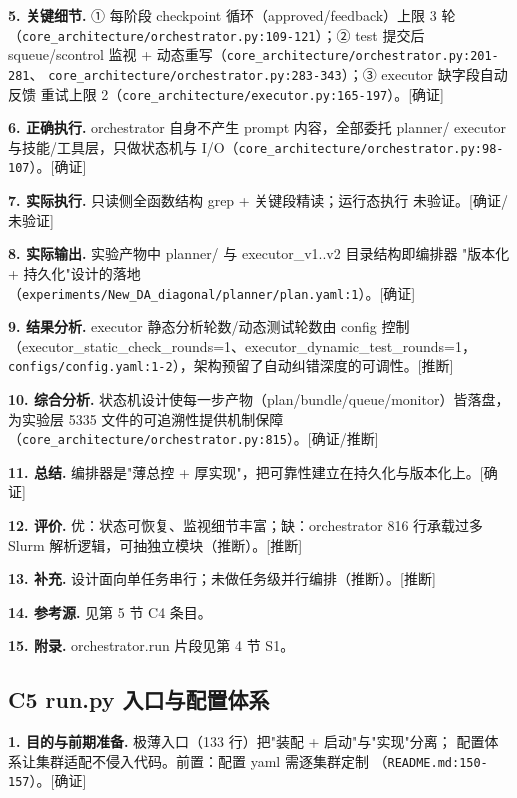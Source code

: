\documentclass[UTF8]{ctexart}
\begin{document}
\noindent\textbf{5. 关键细节.} ① 每阶段 checkpoint 循环（approved/feedback）上限 3 轮
（\texttt{\nolinkurl{core_architecture/orchestrator.py:109-121}}）；② test 提交后
squeue/scontrol 监视 + 动态重写（\texttt{\nolinkurl{core_architecture/orchestrator.py:201-281}}、
\texttt{\nolinkurl{core_architecture/orchestrator.py:283-343}}）；③ executor 缺字段自动反馈
重试上限 2（\texttt{\nolinkurl{core_architecture/executor.py:165-197}}）。[确证]

\noindent\textbf{6. 正确执行.} orchestrator 自身不产生 prompt 内容，全部委托 planner/
executor 与技能/工具层，只做状态机与 I/O（\texttt{\nolinkurl{core_architecture/orchestrator.py:98-107}}）。[确证]

\noindent\textbf{7. 实际执行.} 只读侧全函数结构 grep + 关键段精读；运行态执行 \textcolor{warn}{未验证}。[确证/未验证]

\noindent\textbf{8. 实际输出.} 实验产物中 planner/ 与 executor\_v1..v2 目录结构即编排器
"版本化 + 持久化"设计的落地（\texttt{\nolinkurl{experiments/New_DA_diagonal/planner/plan.yaml:1}}）。[确证]

\noindent\textbf{9. 结果分析.} executor 静态分析轮数/动态测试轮数由 config 控制
（executor\_static\_check\_rounds=1、executor\_dynamic\_test\_rounds=1，
\texttt{\nolinkurl{configs/config.yaml:1-2}}），架构预留了自动纠错深度的可调性。[推断]

\noindent\textbf{10. 综合分析.} 状态机设计使每一步产物（plan/bundle/queue/monitor）皆落盘，
为实验层 5335 文件的可追溯性提供机制保障（\texttt{\nolinkurl{core_architecture/orchestrator.py:815}}）。[确证/推断]

\noindent\textbf{11. 总结.} 编排器是"薄总控 + 厚实现"，把可靠性建立在持久化与版本化上。[确证]

\noindent\textbf{12. 评价.} 优：状态可恢复、监视细节丰富；缺：orchestrator 816 行承载过多
Slurm 解析逻辑，可抽独立模块（推断）。[推断]

\noindent\textbf{13. 补充.} 设计面向单任务串行；未做任务级并行编排（推断）。[推断]

\noindent\textbf{14. 参考源.} 见第 5 节 C4 条目。

\noindent\textbf{15. 附录.} orchestrator.run 片段见第 4 节 S1。

\subsection{C5 run.py 入口与配置体系}

\noindent\textbf{1. 目的与前期准备.} 极薄入口（133 行）把"装配 + 启动"与"实现"分离；
配置体系让集群适配不侵入代码。前置：配置 yaml 需逐集群定制
（\texttt{\nolinkurl{README.md:150-157}}）。[确证]
\end{document}
